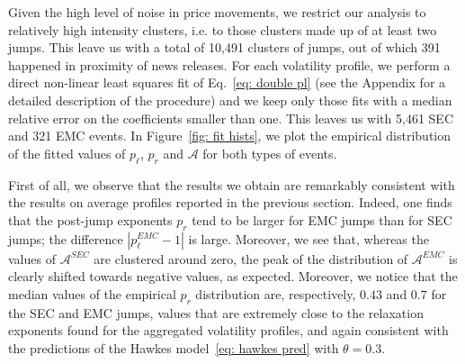\documentclass[amsmath,amssymb,aps,pre,floatfix,twocolumn,superscriptaddress]{revtex4}
\begin{document}
Given the high level of noise in price movements, we restrict our analysis to relatively high intensity clusters, i.e. to those clusters made up of at least two jumps. This leave us with a total of 10,491 clusters of jumps, out of which 391 happened in proximity of news releases. For each volatility profile, we perform a direct non-linear least squares fit of Eq.~\ref{eq: double pl} (see the Appendix for a detailed description of the procedure) and we keep only those fits with a median relative error on the coefficients smaller than one. This leaves us with 5,461 SEC and 321 EMC events. In Figure~\ref{fig: fit hists}, we plot the empirical distribution of the fitted values of $p_{\ell}$, $p_r$ and $\mathcal{A}$ for both types of events.

First of all, we observe that the results we obtain are remarkably consistent with the results on average profiles reported in the previous section. Indeed, one finds that the post-jump exponents $p_r$ tend to be larger for EMC jumps than for SEC jumps; the difference $|p_{\ell}^{EMC} - 1|$ is large.
Moreover, we see that, whereas the values of $\mathcal{A}^{SEC}$ are clustered around zero, the peak of the distribution of $\mathcal{A}^{EMC}$ is clearly shifted towards negative values, as expected. Moreover, we notice that the median values of the empirical $p_r$ distribution are, respectively, $0.43$ and $0.7$ for the SEC and EMC jumps, values that are extremely close to the relaxation exponents found for the aggregated volatility profiles, and again consistent with the predictions of the Hawkes model~\ref{eq: hawkes pred} with $\theta=0.3$. 
\end{document}
